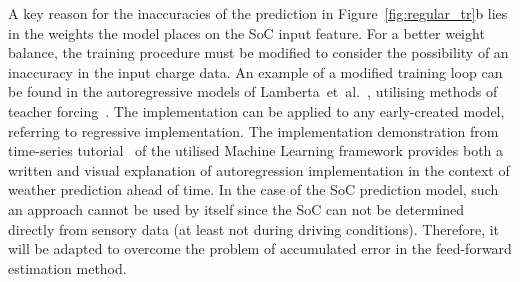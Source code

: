 %
%
A key reason for the inaccuracies of the prediction in \mbox{Figure~\ref{fig:regular_tr}b} lies in the weights the model places on the SoC input feature.
For a better weight balance, the training procedure must be modified to consider the possibility of an inaccuracy in the input charge data.
An example of a modified training loop can be found in the autoregressive models of \mbox{Lamberta et al.~\cite{time_2020}}, utilising methods of teacher forcing~\cite{brownlee_what_2017,orac_lstm_2024}.
The implementation can be applied to any early-created model, referring to regressive implementation.
The implementation demonstration from time-series tutorial~\cite{time_2020} of the utilised Machine Learning framework provides both a written and visual explanation of autoregression implementation in the context of weather prediction ahead of time.
In the case of the SoC prediction model, such an approach cannot be used by itself since the SoC can not be determined directly from sensory data (at least not during driving conditions).
Therefore, it will be adapted to overcome the problem of accumulated error in the feed-forward estimation method.

